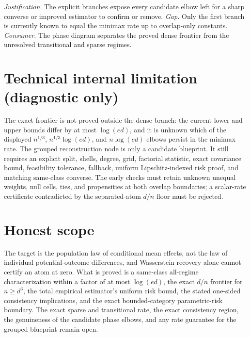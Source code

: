 \documentclass{article}
\begin{document}
\par\smallskip\noindent \textit{Justification.} The explicit branches expose every candidate elbow left for a sharp converse or improved estimator to confirm or remove. \textit{Gap.} Only the first branch is currently known to equal the minimax rate up to overlap-only constants. \textit{Consumer.} The phase diagram separates the proved dense frontier from the unresolved transitional and sparse regimes.

\section*{Technical internal limitation (diagnostic only)}

The exact frontier is not proved outside the dense branch: the current lower and upper bounds differ by at most \(\log(ed)\), and it is unknown which of the displayed \(n^{1/3}\), \(n^{1/3}\log(ed)\), and \(n\log(ed)\) elbows persist in the minimax rate.  The grouped reconstruction node is only a candidate blueprint.  It still requires an explicit split, shells, degree, grid, factorial statistic, exact covariance bound, feasibility tolerance, fallback, uniform Lipschitz-indexed risk proof, and matching same-class converse.  The early checks must retain unknown unequal weights, null cells, ties, and propensities at both overlap boundaries; a scalar-rate certificate contradicted by the separated-atom \(d/n\) floor must be rejected.

\section{Honest scope}

The target is the population law of conditional mean effects, not the law of individual potential-outcome differences, and Wasserstein recovery alone cannot certify an atom at zero.  What is proved is a same-class all-regime characterization within a factor of at most \(\log(ed)\), the exact \(d/n\) frontier for \(n\ge d^3\), the total empirical estimator's uniform risk bound, the stated one-sided consistency implications, and the exact bounded-category parametric-risk boundary.  The exact sparse and transitional rate, the exact consistency region, the genuineness of the candidate phase elbows, and any rate guarantee for the grouped blueprint remain open.
\end{document}
